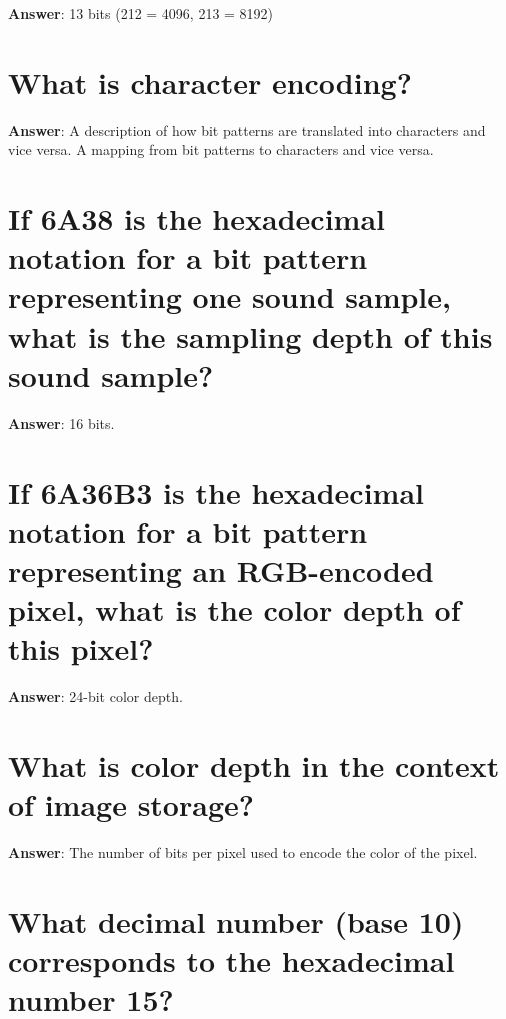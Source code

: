 \documentclass[a4paper,11pt,oneside]{book}
\begin{document}
\begin{sloppypar}
\label{q:67:sa:en:True}

\textbf{Answer}: 13 bits (212 = 4096, 213 = 8192)



\section{What is character encoding?}

\label{q:68:sa:en:True}

\textbf{Answer}: A description of how bit patterns are translated into characters and vice versa. A mapping from bit patterns to characters and vice versa.



\section{If 6A38 is the hexadecimal notation for a bit pattern representing one sound sample, what is the sampling depth of this sound sample?}

\label{q:71:sa:en:True}

\textbf{Answer}: 16 bits.



\section{If 6A36B3 is the hexadecimal notation for a bit pattern representing an RGB-encoded pixel, what is the color depth of this pixel?}

\label{q:72:sa:en:True}

\textbf{Answer}: 24-bit color depth.



\section{What is color depth in the context of image storage?}

\label{q:73:sa:en:True}

\textbf{Answer}: The number of bits per pixel used to encode the color of the pixel.



\section{What decimal number (base 10) corresponds to the hexadecimal number 15?}

\label{q:74:sa:en:True}


\end{sloppypar}
\end{document}
